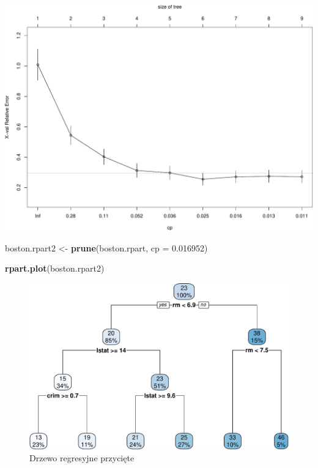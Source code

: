 \documentclass[
]{book}
\newenvironment{Shaded}{\begin{snugshade}}{\end{snugshade}}
\newcommand{\AttributeTok}[1]{\textcolor[rgb]{0.13,0.29,0.53}{#1}}
\newcommand{\FloatTok}[1]{\textcolor[rgb]{0.00,0.00,0.81}{#1}}
\newcommand{\FunctionTok}[1]{\textcolor[rgb]{0.13,0.29,0.53}{\textbf{#1}}}
\newcommand{\NormalTok}[1]{#1}
\newcommand{\OtherTok}[1]{\textcolor[rgb]{0.56,0.35,0.01}{#1}}
\theoremstyle{plain}
\theoremstyle{definition}
\theoremstyle{definition}
\theoremstyle{definition}
\theoremstyle{definition}
\theoremstyle{definition}
\theoremstyle{remark}
\begin{document}
\includegraphics{EksploracjaDanych_files/figure-latex/unnamed-chunk-33-1.pdf}

\begin{Shaded}
\begin{Highlighting}[]
\NormalTok{boston.rpart2 }\OtherTok{\textless{}{-}} \FunctionTok{prune}\NormalTok{(boston.rpart, }\AttributeTok{cp =} \FloatTok{0.016952}\NormalTok{)}
\end{Highlighting}
\end{Shaded}

\begin{Shaded}
\begin{Highlighting}[]
\FunctionTok{rpart.plot}\NormalTok{(boston.rpart2)}
\end{Highlighting}
\end{Shaded}

\begin{figure}
\centering
\includegraphics{EksploracjaDanych_files/figure-latex/unnamed-chunk-34-1.pdf}
\caption{\label{fig:unnamed-chunk-34}Drzewo regresyjne przycięte}
\end{figure}
\end{document}
